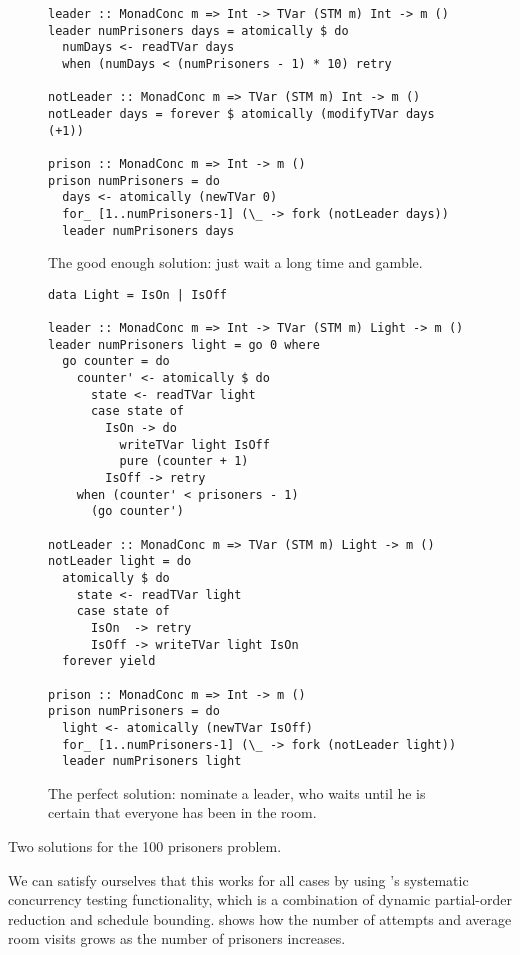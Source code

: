 \begin{listing}
\begin{subfigure}{\textwidth}
\begin{verbatim}
leader :: MonadConc m => Int -> TVar (STM m) Int -> m ()
leader numPrisoners days = atomically $ do
  numDays <- readTVar days
  when (numDays < (numPrisoners - 1) * 10) retry

notLeader :: MonadConc m => TVar (STM m) Int -> m ()
notLeader days = forever $ atomically (modifyTVar days (+1))

prison :: MonadConc m => Int -> m ()
prison numPrisoners = do
  days <- atomically (newTVar 0)
  for_ [1..numPrisoners-1] (\_ -> fork (notLeader days))
  leader numPrisoners days
\end{verbatim}
\caption{The good enough solution: just wait a long time and gamble.}\label{lst:100good}
\end{subfigure}

\vspace{2.5em}

\begin{subfigure}{\textwidth}
\begin{verbatim}
data Light = IsOn | IsOff

leader :: MonadConc m => Int -> TVar (STM m) Light -> m ()
leader numPrisoners light = go 0 where
  go counter = do
    counter' <- atomically $ do
      state <- readTVar light
      case state of
        IsOn -> do
          writeTVar light IsOff
          pure (counter + 1)
        IsOff -> retry
    when (counter' < prisoners - 1)
      (go counter')

notLeader :: MonadConc m => TVar (STM m) Light -> m ()
notLeader light = do
  atomically $ do
    state <- readTVar light
    case state of
      IsOn  -> retry
      IsOff -> writeTVar light IsOn
  forever yield

prison :: MonadConc m => Int -> m ()
prison numPrisoners = do
  light <- atomically (newTVar IsOff)
  for_ [1..numPrisoners-1] (\_ -> fork (notLeader light))
  leader numPrisoners light
\end{verbatim}
\caption{The perfect solution: nominate a leader, who waits until he is certain that everyone has been in the room.}\label{lst:100perfect}
\end{subfigure}
\caption{Two solutions for the 100 prisoners problem.}\label{lst:100sols}
\end{listing}

We can satisfy ourselves that this works for all cases by using
\dejafu{}'s systematic concurrency testing functionality, which is a
combination of dynamic partial-order reduction and schedule bounding.
 shows how the number of attempts and average room
visits grows as the number of prisoners increases.

